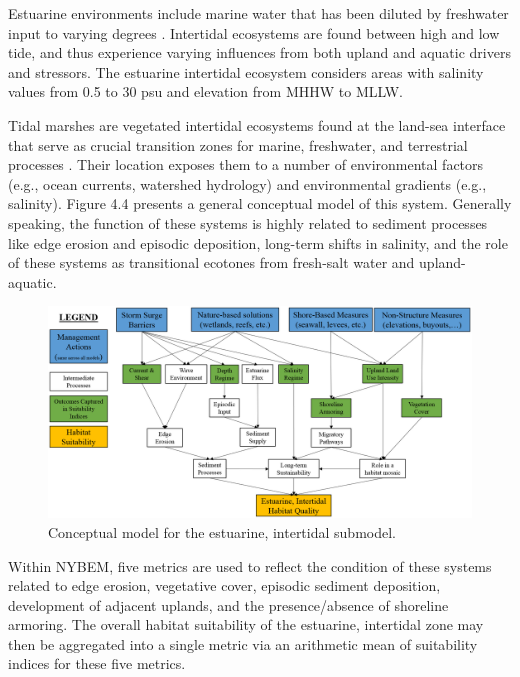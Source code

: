 \documentclass[
]{book}
\begin{document}
Estuarine environments include marine water that has been diluted by freshwater input to varying degrees \citep{prosser_impacts_2018}. Intertidal ecosystems are found between high and low tide, and thus experience varying influences from both upland and aquatic drivers and stressors. The estuarine intertidal ecosystem considers areas with salinity values from 0.5 to 30 psu and elevation from MHHW to MLLW.

Tidal marshes are vegetated intertidal ecosystems found at the land-sea interface that serve as crucial transition zones for marine, freshwater, and terrestrial processes \citep{colombano_climate_2021}. Their location exposes them to a number of environmental factors (e.g., ocean currents, watershed hydrology) and environmental gradients (e.g., salinity)\citep{lauchlan_species_2020}. Figure 4.4 presents a general conceptual model of this system. Generally speaking, the function of these systems is highly related to sediment processes like edge erosion and episodic deposition, long-term shifts in salinity, and the role of these systems as transitional ecotones from fresh-salt water and upland-aquatic.

\begin{figure}
\includegraphics[width=23.08in]{ZZ_Fig04.04_Est.Int_ConModel} \caption{Conceptual model for the estuarine, intertidal submodel.}\label{fig:unnamed-chunk-12}
\end{figure}

Within NYBEM, five metrics are used to reflect the condition of these systems related to edge erosion, vegetative cover, episodic sediment deposition, development of adjacent uplands, and the presence/absence of shoreline armoring. The overall habitat suitability of the estuarine, intertidal zone may then be aggregated into a single metric via an arithmetic mean of suitability indices for these five metrics.
\end{document}
